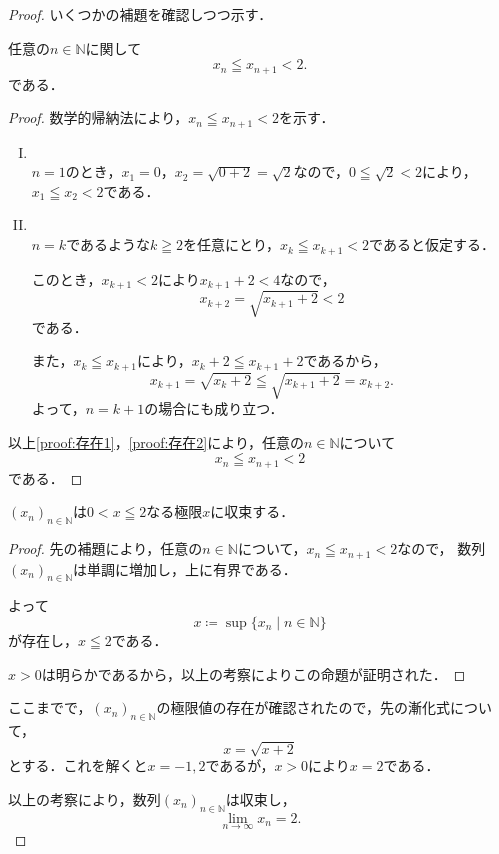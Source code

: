 \documentclass[a4paper,11pt]{ltjsarticle}
\newenvironment{tleftbar}{\begin{tbleftline}\setlength{\parindent}{1\zw}}{\end{tbleftline}}
\newenvironment{dotleftbar}{%
  \begin{tbdotleftline}\setlength{\parindent}{1\zw}%
}{%
  \end{tbdotleftline}%
}
\begin{document}
\begin{tleftbar}
  \begin{proof}
    いくつかの補題を確認しつつ示す．
\begin{lemma}{}{}
  任意の$n \in \mathbb{N}$に関して
  \[
  x_n \leqq x_{n+1} < 2.
  \]
  である．
\end{lemma}

\begin{dotleftbar}
\begin{proof}
  数学的帰納法により，$x_n \leqq x_{n+1} < 2$を示す．
  \begin{enumerate}[(I)]
    \item \mbox{} \\ \label{proof:存在1}
    $n=1$のとき，$ x_1 =0$，$x_2= \sqrt{0+2}=\sqrt{2}$なので，$ 0 \leqq \sqrt{2} < 2$により，
    $x_1 \leqq x_2 < 2$である．
    \item \mbox{} \\ \label{proof:存在2}
    $n=k$であるような$k \geqq 2$を任意にとり，$x_k \leqq x_{k+1} < 2$であると仮定する．

    このとき，$x_{k+1} < 2$により$ x_{k+1}+2 < 4$なので，
    \[
    x_{k+2}=\sqrt{x_{k+1} + 2} < 2
    \]
    である．

    また，$x_k \leqq x_{k+1}$により，$x_k +2  \leqq x_{k+1}+2$であるから，
    \[
    x_{k+1}= \sqrt{x_k +2} \leqq \sqrt{x_{k+1}+2}=x_{k+2}.
    \]
    よって，$n=k+1$の場合にも成り立つ．
  \end{enumerate}
  以上\ref{proof:存在1}，\ref{proof:存在2}により，任意の$n \in \mathbb{N}$について
  \[
  x_n \leqq x_{n+1} < 2
  \]
  である．
\end{proof}
\end{dotleftbar}

\begin{lemma}{}{}
  $(x_n)_{n \in \mathbb{N}}$は$ 0<  x \leqq 2$なる極限$x$に収束する．
\end{lemma}

\begin{dotleftbar}
\begin{proof}
先の補題により，任意の$n \in \mathbb{N}$について，$ x_n \leqq x_{n+1} <2$なので，
数列$(x_n)_{n \in \mathbb{N}}$は単調に増加し，上に有界である．

よって
\[
x \coloneqq \sup \{ x_n \mid n \in \mathbb{N} \}
\]
が存在し，$x \leqq  2$である．

$ x>0$は明らかであるから，以上の考察によりこの命題が証明された．
\end{proof}
\end{dotleftbar}

ここまでで，$(x_n)_{n \in \mathbb{N}}$の極限値の存在が確認されたので，先の漸化式について，
\[
x=\sqrt{x+2}
\]
とする．これを解くと$ x= -1,2$であるが，$x>0$により$x=2$である．

以上の考察により，数列$(x_n)_{n \in \mathbb{N}}$は収束し，
\[
\lim_{n \to \infty} x_n =2.
\]
\end{proof}
\end{tleftbar}
\end{document}
